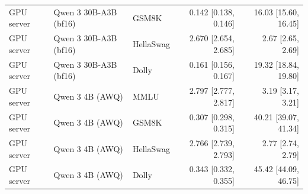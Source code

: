 \begin{longtable}{@{}l l l r r@{}}
GPU server & Qwen 3 30B-A3B (bf16) & GSM8K & 0.142 [0.138, 0.146] & 16.03 [15.60, 16.45] \\
GPU server & Qwen 3 30B-A3B (bf16) & HellaSwag & 2.670 [2.654, 2.685] & 2.67 [2.65, 2.69] \\
GPU server & Qwen 3 30B-A3B (bf16) & Dolly & 0.161 [0.156, 0.167] & 19.32 [18.84, 19.80] \\
GPU server & Qwen 3 4B (AWQ) & MMLU & 2.797 [2.777, 2.817] & 3.19 [3.17, 3.21] \\
GPU server & Qwen 3 4B (AWQ) & GSM8K & 0.307 [0.298, 0.315] & 40.21 [39.07, 41.34] \\
GPU server & Qwen 3 4B (AWQ) & HellaSwag & 2.766 [2.739, 2.793] & 2.77 [2.74, 2.79] \\
GPU server & Qwen 3 4B (AWQ) & Dolly & 0.343 [0.332, 0.355] & 45.42 [44.09, 46.75] \\
\end{longtable}
